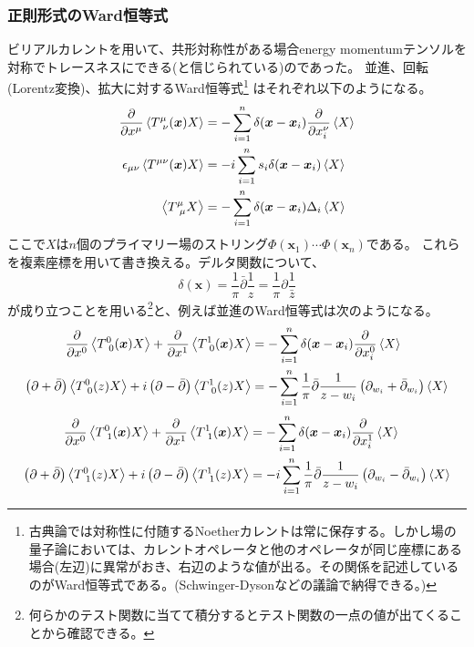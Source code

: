 \documentclass[11pt, aps, longbibliography]{article}
\numberwithin{equation}{section}
\begin{document}
    \subsubsection{正則形式のWard恒等式}
        ビリアルカレントを用いて、共形対称性がある場合energy momentumテンソルを対称でトレースネスにできる(と信じられている)のであった。
        並進、回転(Lorentz変換)、拡大に対するWard恒等式\footnote{古典論では対称性に付随するNoetherカレントは常に保存する。しかし場の量子論においては、カレントオペレータと他のオペレータが同じ座標にある場合(左辺)に異常がおき、右辺のような値が出る。その関係を記述しているのがWard恒等式である。(Schwinger-Dysonなどの議論で納得できる。)}
        はそれぞれ以下のようになる。
        \begin{align}
            \frac{\partial}{\partial x^\mu} \expval{T^\mu_{\ \nu}(\bm{x})X} &= - \sum_{i=1}^{n} \delta(\bm{x}- \bm{x}_i) \frac{\partial}{\partial x_i^\nu}\expval{X} \label{eq:ward1} \\
            \epsilon_{\mu\nu}\expval{T^{\mu\nu}(\bm{x})X} &= -i \sum_{i=1}^{n}s_i \delta(\bm{x}- \bm{x}_i) \expval{X} \label{eq:ward2} \\
            \expval{T^\mu_{\ \mu}X} &= - \sum_{i=1}^{n}\delta(\bm{x}- \bm{x}_i)\Delta_i \expval{X} \label{eq:ward3}
        \end{align}
        ここで$X$は$n$個のプライマリー場のストリング$\Phi(\bm{x}_1)\cdots \Phi(\bm{x}_n)$である。
        これらを複素座標を用いて書き換える。デルタ関数について、
        \begin{equation}
            \delta(\bm{x}) = \frac{1}{\pi} \bar{\partial}\frac{1}{z} = \frac{1}{\pi} \partial \frac{1}{\bar{z}}
        \end{equation}
        が成り立つことを用いる\footnote{何らかのテスト関数に当てて積分するとテスト関数の一点の値が出てくることから確認できる。}と、例えば並進のWard恒等式は次のようになる。
        \begin{align}
            \frac{\partial}{\partial x^0} \expval{T^0_{\  0}(\bm{x})X} + \frac{\partial}{\partial x^1} \expval{T^1_{\  0}(\bm{x})X} &= - \sum_{i=1}^{n} \delta(\bm{x}- \bm{x}_i) \frac{\partial}{\partial x_i^0}\expval{X} \notag \\
            \left(  \partial + \bar{\partial}\right) \expval{T^0_{\  0}(z)X} + i\left(  \partial - \bar{\partial}\right)  \expval{T^1_{\  0}(z)X} &= -\sum_{i=1}^{n} \frac{1}{\pi} \bar{\partial} \frac{1}{z-w_i}\left(  \partial_{w_i} + \bar{\partial}_{w_i}\right) \expval{X}
        \end{align}
        \begin{align}
            \frac{\partial}{\partial x^0} \expval{T^0_{\  1}(\bm{x})X} + \frac{\partial}{\partial x^1} \expval{T^1_{\  1}(\bm{x})X} &= - \sum_{i=1}^{n} \delta(\bm{x}- \bm{x}_i) \frac{\partial}{\partial x_i^1}\expval{X} \notag \\
            \left(  \partial + \bar{\partial}\right) \expval{T^0_{\  1}(z)X} + i\left(  \partial - \bar{\partial}\right)  \expval{T^1_{\  1}(z)X} &= -i\sum_{i=1}^{n} \frac{1}{\pi} \bar{\partial} \frac{1}{z-w_i}\left(  \partial_{w_i} - \bar{\partial}_{w_i}\right) \expval{X}
        \end{align}
\end{document}

